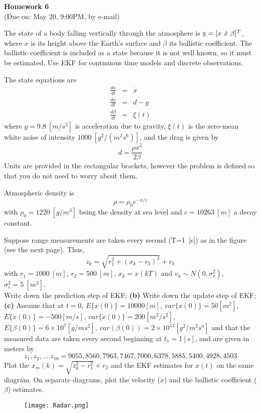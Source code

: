 \documentclass{article}
\begin{document}
 
\begin{center}
{\bf \Large  Homework 6} \\
(Due on: May 20, 9:00PM, by e-mail)
\end{center}


\noindent The state of a body falling vertically through the atmosphere is $\underline{\bf \rm x}=[x\ {\dot x}\ \beta]^T$, 
where $x$ is its height above the Earth's surface and $\beta$ its ballistic coefficient. The ballistic coefficient is included as a state because it is not well known,  so it must be estimated. Use EKF for continuous time models and discrete observations.

The state equations are
\begin{eqnarray}
   \frac{d x}{dt} &=& \dot x \\
   \frac{d {\dot x}}{dt} &=& d-g \\
   \frac{d \beta}{dt} &=& \xi(t)
\end{eqnarray}
 where $g=9.8\  [m/s^2]$ is acceleration due to gravity, $\xi(t)$ is the zero-mean white noise of intensity $1000\  [g^2/(m^2 s^6)]$, 
and the drag is given by 
\begin{equation}
  d= \frac{\rho {\dot x}^2}{2 \beta}
\end{equation}
Units are provided in the rectangular brackets, however the problem is defined so that you do not need to worry about them. 

Atmospheric density is 
\begin{equation}
  \rho = \rho_0 e^{- x /c}
\end{equation}
with $\rho_0=1220\  [g/m^3]$ being the density at sea level and $c=10263\  [m]$ a decay constant.

Suppose range measurements are taken every second (T=1\  [s]) as in the figure (see the next page). Thus, 
\begin{equation}
  z_k=\sqrt{r_1^2+(x_k-r_2)^2 }+ v_k
\end{equation}
with $r_1=1000\  [m]$, $r_2=500\ [m]$,  $x_k=x(kT)$ and $v_k \sim N(0,\sigma^2_r)$,  $\sigma_r^2=5\  [m^2]$.\\


 Write down the prediction step of EKF; {\bf (b)} Write down the update step of EKF;  {\bf (c)} Assume that at $t=0$, $E\{ x(0)\}=10000[m]$, $var\{ x(0)\}=50[m^2]$,  $E\{{\dot  x}(0)\}=-500[m/s]$, 
 $var\{ {\dot x}(0)\}=200[m^2/s^2]$, $E\{\beta(0)\}=6 \times 10^7 [g/ms^2]$, 
$var(\beta(0))=2 \times 10^{12} [g^2/m^2 s^4]$ and that the measured data are taken every second 
beginning at $t_1=1[s]$, and are given in meters by 
\begin{equation}
z_1,z_2,....z_{10}= 9055, 8560, 7963, 7467, 7000, 6378, 5885, 5400, 4928, 4503
\end{equation}
Plot the $x_m(k)=\sqrt{z_k^2-r_1^2}+r_2$ and the EKF estimates for $x(t)$ on the same 
diagram. On separate diagrams, plot the velocity ($\dot x$) and the ballistic coefficient ($\beta$) estimates. 

\begin{figure}[h]
\begin{center}
\texttt{[image: Radar.png]}
\end{center}
\end{figure}

  
\end{document}
